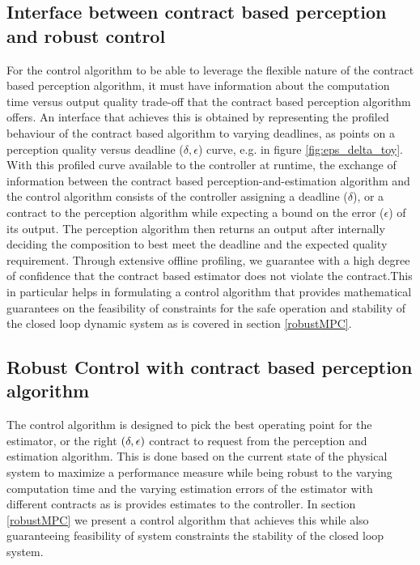 
\subsection{Interface between contract based perception and robust control}

For the control algorithm to be able to leverage the flexible nature of the contract based perception algorithm, it must have information about the computation time versus output quality trade-off that the contract based perception algorithm offers. An interface that achieves this is obtained by representing the profiled behaviour of the contract based algorithm to varying deadlines, as points on a perception quality versus deadline ($\delta, \epsilon$) curve, e.g. in figure \ref{fig:eps_delta_toy}.
With this profiled curve available to the controller at runtime, the exchange of information between the contract based perception-and-estimation algorithm and the control algorithm consists of the controller assigning a deadline ($\delta$), or a contract to the perception algorithm while expecting a bound on the error ($\epsilon$) of its output. The perception algorithm then returns an output after internally deciding the composition to best meet the deadline and the expected quality requirement. 
Through extensive offline profiling, we guarantee with a high degree of confidence that the contract based estimator does not violate the contract.This in particular helps in formulating a control algorithm that provides mathematical guarantees on the feasibility of constraints for the safe operation and stability of the closed loop dynamic system as is covered in section \ref{robustMPC}.

\subsection{Robust Control with contract based perception algorithm}

The control algorithm is designed to pick the best operating point for the estimator, or the right $(\delta,\epsilon)$ contract to request from the perception and estimation algorithm. This is done based on the current state of the physical system to maximize a performance measure while being robust to the varying computation time and the varying estimation errors of the estimator with different contracts as is provides estimates to the controller. In section \ref{robustMPC} we present a control algorithm that achieves this while also guaranteeing feasibility of system constraints the stability of the closed loop system.






